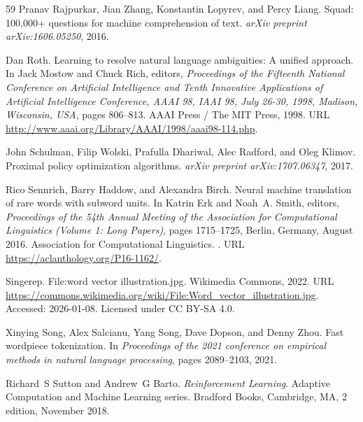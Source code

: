 \begin{thebibliography}{59}
Pranav Rajpurkar, Jian Zhang, Konstantin Lopyrev, and Percy Liang.
\newblock Squad: 100,000+ questions for machine comprehension of text.
\newblock \emph{arXiv preprint arXiv:1606.05250}, 2016.

Dan Roth.
\newblock Learning to resolve natural language ambiguities: {A} unified approach.
\newblock In Jack Mostow and Chuck Rich, editors, \emph{Proceedings of the Fifteenth National Conference on Artificial Intelligence and Tenth Innovative Applications of Artificial Intelligence Conference, {AAAI} 98, {IAAI} 98, July 26-30, 1998, Madison, Wisconsin, {USA}}, pages 806--813. {AAAI} Press / The {MIT} Press, 1998.
\newblock URL \url{http://www.aaai.org/Library/AAAI/1998/aaai98-114.php}.

John Schulman, Filip Wolski, Prafulla Dhariwal, Alec Radford, and Oleg Klimov.
\newblock Proximal policy optimization algorithms.
\newblock \emph{arXiv preprint arXiv:1707.06347}, 2017.

Rico Sennrich, Barry Haddow, and Alexandra Birch.
\newblock Neural machine translation of rare words with subword units.
\newblock In Katrin Erk and Noah~A. Smith, editors, \emph{Proceedings of the 54th Annual Meeting of the Association for Computational Linguistics (Volume 1: Long Papers)}, pages 1715--1725, Berlin, Germany, August 2016. Association for Computational Linguistics.
\newblock {}.
\newblock URL \url{https://aclanthology.org/P16-1162/}.

Singerep.
\newblock File:word vector illustration.jpg.
\newblock Wikimedia Commons, 2022.
\newblock URL \url{https://commons.wikimedia.org/wiki/File:Word_vector_illustration.jpg}.
\newblock Accessed: 2026-01-08. Licensed under CC BY-SA 4.0.

Xinying Song, Alex Salcianu, Yang Song, Dave Dopson, and Denny Zhou.
\newblock Fast wordpiece tokenization.
\newblock In \emph{Proceedings of the 2021 conference on empirical methods in natural language processing}, pages 2089--2103, 2021.

Richard~S Sutton and Andrew~G Barto.
\newblock \emph{Reinforcement Learning}.
\newblock Adaptive Computation and Machine Learning series. Bradford Books, Cambridge, MA, 2 edition, November 2018.


\end{thebibliography}
